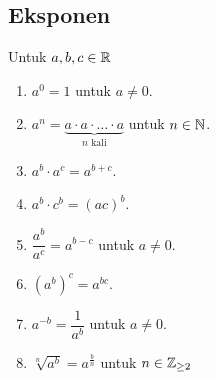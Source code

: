 \subsection{Eksponen}
Untuk $a,b,c \in \mathbb R$
\begin{enumerate}
    \item $a^0=1$ untuk $a \neq 0$.
    \item $a^n =  \underbrace{a \cdot a \cdot \ldots \cdot a}_{n \text{ kali}}$ untuk $n \in \mathbb N$.
    \item $a^b\cdot a^c=a^{b+c}$.
    \item $a^b\cdot c^b = (ac)^b$.
    \item $\dfrac{a^b}{a^c}=a^{b-c}$ untuk $a\neq 0$.
    \item $(a^b)^c=a^{bc}$.
    \item $a^{-b} = \dfrac{1}{a^b}$ untuk $a \neq 0$.
    \item $\sqrt[n]{a^b}=a^{\frac{b}{n}}$ untuk $n \in \mathbb Z_{\ge 2}$
\end{enumerate}
